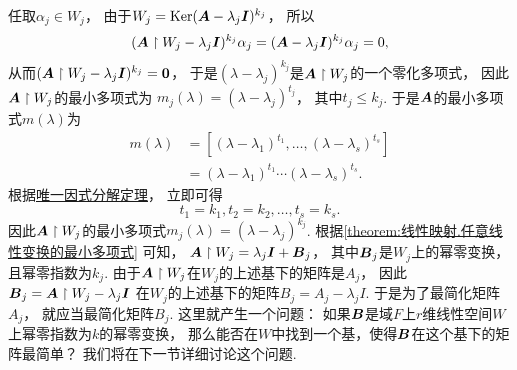 任取\(\alpha_j \in W_j\)，
由于\(W_j = \operatorname{Ker}(\boldsymbol{A} - \lambda_j \boldsymbol{I})^{k_j}\)，
所以\[
	(\boldsymbol{A} \upharpoonright W_j - \lambda_j \boldsymbol{I})^{k_j} \alpha_j
	= (\boldsymbol{A} - \lambda_j \boldsymbol{I})^{k_j} \alpha_j
	= 0,
\]
从而\((\boldsymbol{A} \upharpoonright W_j - \lambda_j \boldsymbol{I})^{k_j} = \boldsymbol0\)，
于是\((\lambda-\lambda_j)^{k_j}\)是\(\boldsymbol{A} \upharpoonright W_j\)的一个零化多项式，
因此\(\boldsymbol{A} \upharpoonright W_j\)的最小多项式为
\(m_j(\lambda) = (\lambda-\lambda_j)^{t_j}\)，
其中\(t_j \leq k_j\).
于是\(\boldsymbol{A}\)的最小多项式\(m(\lambda)\)为\begin{align*}
	m(\lambda)
	&= [(\lambda-\lambda_1)^{t_1},\dotsc,(\lambda-\lambda_s)^{t_s}] \\
	&= (\lambda-\lambda_1)^{t_1} \dotsm (\lambda-\lambda_s)^{t_s}.
\end{align*}
根据\hyperref[theorem:多项式.唯一因式分解定理]{唯一因式分解定理}，
立即可得\[
	t_1 = k_1,
	t_2 = k_2,
	\dotsc,
	t_s = k_s.
\]
因此\(\boldsymbol{A} \upharpoonright W_j\)的最小多项式\(m_j(\lambda) = (\lambda-\lambda_j)^{k_j}\).
根据\cref{theorem:线性映射.任意线性变换的最小多项式} 可知，
\(\boldsymbol{A} \upharpoonright W_j = \lambda_j \boldsymbol{I} + \boldsymbol{B}_j\)，
其中\(\boldsymbol{B}_j\)是\(W_j\)上的幂零变换，且幂零指数为\(k_j\).
由于\(\boldsymbol{A} \upharpoonright W_j\)在\(W_j\)的上述基下的矩阵是\(A_j\)，
因此\(\boldsymbol{B}_j = \boldsymbol{A} \upharpoonright W_j - \lambda_j \boldsymbol{I}\)
在\(W_j\)的上述基下的矩阵\(B_j = A_j - \lambda_j I\).
于是为了最简化矩阵\(A_j\)，
就应当最简化矩阵\(B_j\).
这里就产生一个问题：
如果\(\boldsymbol{B}\)是域\(F\)上\(r\)维线性空间\(W\)上幂零指数为\(k\)的幂零变换，
那么能否在\(W\)中找到一个基，使得\(\boldsymbol{B}\)在这个基下的矩阵最简单？
我们将在下一节详细讨论这个问题.
